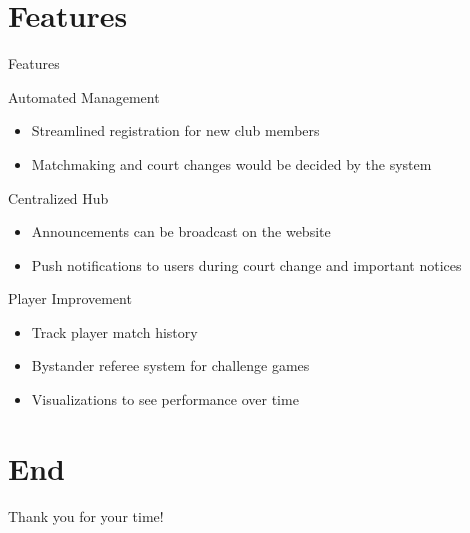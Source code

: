 \documentclass{beamer}
\begin{document}
\section{Features}

\begin{frame}{Features}
\begin{block}{Automated Management}
    \begin{itemize}
        \item Streamlined registration for new club members
        \item Matchmaking and court changes would be decided by the system
    \end{itemize}
\end{block}
\begin{block}{Centralized Hub}
    \begin{itemize}
        \item Announcements can be broadcast on the website
        \item Push notifications to users during court change and important notices
    \end{itemize}
\end{block}
\begin{block}{Player Improvement}
    \begin{itemize}
        \item Track player match history
        \item Bystander referee system for challenge games
        \item Visualizations to see performance over time
    \end{itemize}
\end{block}
\end{frame}

\section*{End}

\begin{frame}
    \begin{block}{}
    Thank you for your time!
    \end{block}
\end{frame}
\end{document}
